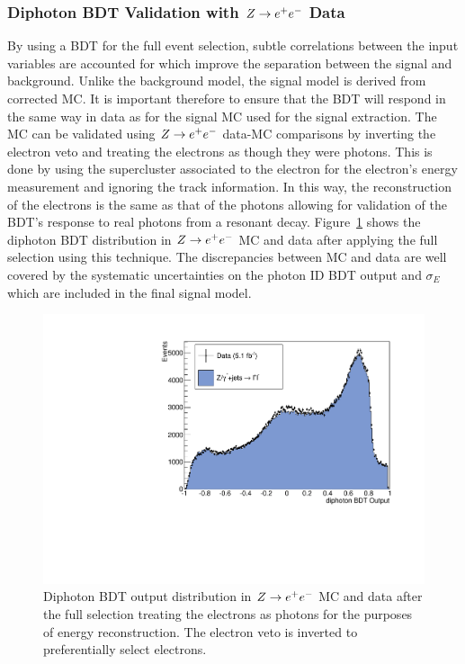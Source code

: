\subsubsection{Diphoton BDT Validation with $Z\rightarrow e^{+}e^{-}$ Data}
By using a BDT for the full event selection, subtle correlations between the input variables are accounted for
which improve the separation between the signal and background. 
Unlike the background model, the signal model is derived from corrected MC. 
It is important therefore to ensure that the BDT will respond in the same way in data as for the signal MC
used for the signal extraction. The MC can be validated using $Z\rightarrow e^{+}e^{-}$ data-MC
comparisons by inverting the electron veto and treating the electrons as though they were photons.
This is done by using the supercluster associated to the electron for the electron's energy measurement 
and ignoring the track information. In this way, the reconstruction of the electrons is the same as that
of the photons allowing for validation of the BDT's response to real photons from a resonant decay. 
Figure~\ref{fig:zeevaliddiphomva} shows the diphoton BDT distribution in $Z\rightarrow e^{+}e^{-}$ MC and data after applying
the full selection using this technique. The discrepancies between MC and data are well covered by the 
systematic uncertainties on the photon ID BDT output and $\sigma_{E}$ which are included in the final signal model. 

\begin{figure}
  \includegraphics[width=.6\textwidth]{hgg7TeV/zeeValidation/zeevalidationdipho.pdf}
\caption{Diphoton BDT output distribution in $Z\rightarrow e^{+}e^{-}$ MC and data after the full selection 
treating the electrons as photons for the purposes of energy reconstruction. The electron 
veto is inverted to preferentially select electrons.}
\label{fig:zeevaliddiphomva}
\end{figure}

